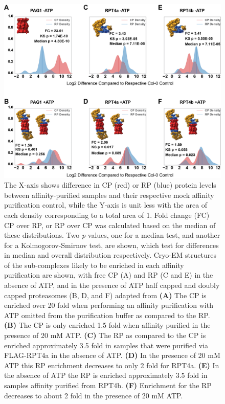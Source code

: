 \begin{figure}[ht]
	\centering
	\includegraphics[width=\columnwidth]{Proteasome/KDEplots.png}
	{The X-axis shows difference in CP (red) or RP (blue) protein levels between affinity-purified samples and their respective mock affinity purification control, while the Y-axis is unit less with the area of each density corresponding to a total area of 1. Fold change (FC) CP over RP, or RP over CP was calculated based on the median of these distributions. Two \textit{p}-values, one for a median test, and another for a Kolmogorov-Smirnov test, are shown, which test for differences in median and overall distribution respectively. Cryo-EM structures of the sub-complexes likely to be enriched in each affinity purification are shown, with free CP (A) and RP (C and E) in the absence of ATP, and in the presence of ATP half capped and doubly capped proteasomes (B, D, and F) adapted from \citep{beck12} \textbf{(A)} The CP is enriched over 20 fold when performing an affinity purification with ATP omitted from the purification buffer as compared to the RP. \textbf{(B)} The CP is only enriched 1.5 fold when affinity purified in the presence of 20 mM ATP. \textbf{(C)} The RP as compared to the CP is enriched approximately 3.5 fold in samples that were purified via FLAG-RPT4a in the absence of ATP. \textbf{(D)} In the presence of 20 mM ATP this RP enrichment decreases to only 2 fold for RPT4a. \textbf{(E)} In the absence of ATP the RP is enriched approximately 3.5 fold in samples affinity purified from RPT4b. \textbf{(F)} Enrichment for the RP decreases to about 2 fold in the presence of 20 mM ATP.}
	\label{fig:supkde}
\end{figure}

